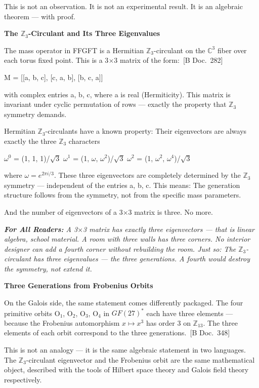 \documentclass[11pt,oneside]{book}
\newcommand{\status}[1]{\penalty10000\,{\scriptsize\textcolor{gray!60}{[#1]}}}
\newenvironment{laierspur}{%
  \par\vspace{4pt}%
  \noindent\small\itshape\color{blue!60!black}%
  \textbf{For All Readers:}\enspace\ignorespaces}{%
  \par\vspace{4pt}\normalsize\normalfont\normalcolor}
\begin{document}
This is not an observation. It is not an experimental result. It is an
algebraic theorem — with proof.

\textbf{The $\mathbb{Z}_3$-Circulant and Its Three Eigenvalues}

The mass operator in FFGFT is a Hermitian $\mathbb{Z}_3$-circulant on the
$\mathbb{C}^3$ fiber over each torus fixed point. This is a 3$\times$3 matrix of the form: \status{B Doc.~282}

M = [[a, b, c],
     [c, a, b],
     [b, c, a]]

with complex entries a, b, c, where a is real (Hermiticity). This matrix is
invariant under cyclic permutation of rows — exactly the property that
$\mathbb{Z}_3$ symmetry demands.

Hermitian $\mathbb{Z}_3$-circulants have a known property: Their eigenvectors are
always exactly the three $\mathbb{Z}_3$ characters

$\omega^0$ = (1, 1, 1)/$\sqrt{3}$
$\omega^1$ = (1, $\omega$, $\omega^2$)/$\sqrt{3}$
$\omega^2$ = (1, $\omega^2$, $\omega^4$)/$\sqrt{3}$

where $\omega = e^{2\pi i/3}$. These three eigenvectors are completely determined
by the $\mathbb{Z}_3$ symmetry — independent of the entries a, b, c. This means:
The generation structure follows from the symmetry, not from the specific
mass parameters.

And the number of eigenvectors of a 3$\times$3 matrix is three. No more.

\begin{laierspur}
A 3$\times$3 matrix has exactly three eigenvectors — that is linear algebra,
school material. A room with three walls has three corners. No interior
designer can add a fourth corner without rebuilding the room. Just so: The
$\mathbb{Z}_3$-circulant has three eigenvalues — the three generations. A fourth
would destroy the symmetry, not extend it.
\end{laierspur}

\textbf{Three Generations from Frobenius Orbits}

On the Galois side, the same statement comes differently packaged. The four
primitive orbits O$_1$, O$_2$, O$_3$, O$_4$ in $GF(27)^*$ each have three elements —
because the Frobenius automorphism $x \mapsto x^3$ has order 3 on $\mathbb{Z}_{13}$.
The three elements of each orbit correspond to the three generations. \status{B Doc.~348}

This is not an analogy — it is the same algebraic statement in two languages.
The $\mathbb{Z}_3$-circulant eigenvector and the Frobenius orbit are the same
mathematical object, described with the tools of Hilbert space theory and
Galois field theory respectively.
\end{document}
